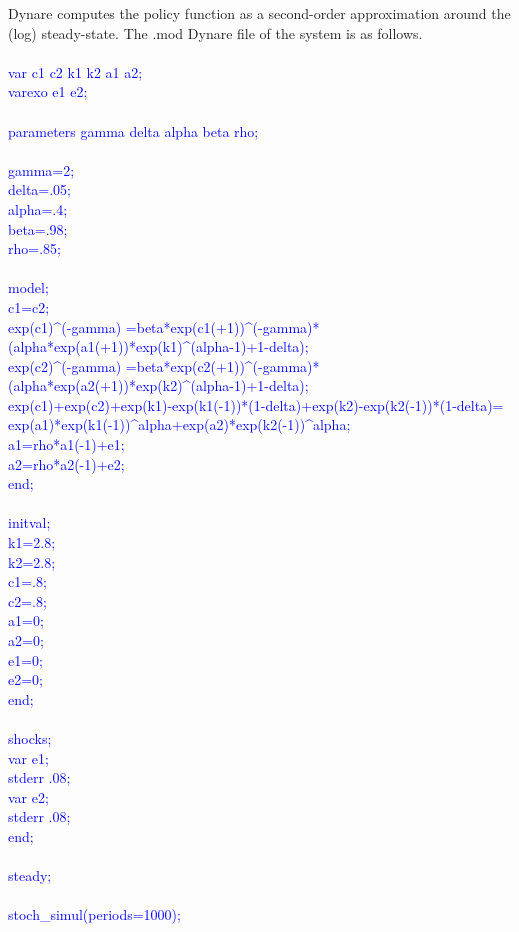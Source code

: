 \documentclass[a4paper,12pt]{scrartcl} %
\begin{document}
Dynare computes the policy function as a second-order approximation around the (log) steady-state. The .mod Dynare file of the system is as follows.\\
\\
\textcolor{blue}{
var c1 c2 k1 k2 a1 a2;\\
varexo e1 e2;\\
\\
parameters gamma delta alpha beta rho;\\
\\
gamma=2;\\
delta=.05;\\
alpha=.4;\\
beta=.98;\\
rho=.85;\\
\\
model;\\
c1=c2;\\
exp(c1)\textasciicircum(-gamma) =beta*exp(c1(+1))\textasciicircum(-gamma)*(alpha*exp(a1(+1))*exp(k1)\textasciicircum(alpha-1)+1-delta);\\
exp(c2)\textasciicircum(-gamma) =beta*exp(c2(+1))\textasciicircum(-gamma)*(alpha*exp(a2(+1))*exp(k2)\textasciicircum(alpha-1)+1-delta);\\
exp(c1)+exp(c2)+exp(k1)-exp(k1(-1))*(1-delta)+exp(k2)-exp(k2(-1))*(1-delta)= exp(a1)*exp(k1(-1))\textasciicircum alpha+exp(a2)*exp(k2(-1))\textasciicircum alpha;\\
a1=rho*a1(-1)+e1;\\
a2=rho*a2(-1)+e2;\\
end;\\
\\
initval;\\
k1=2.8;\\
k2=2.8;\\
c1=.8;\\
c2=.8;\\
a1=0;\\
a2=0;\\
e1=0;\\
e2=0;\\
end;\\
\\
shocks;\\
var e1;\\
stderr .08;\\
var e2;\\
stderr .08;\\
end;\\
\\
steady;\\
\\
stoch\_simul(periods=1000);}\\
\end{document}
